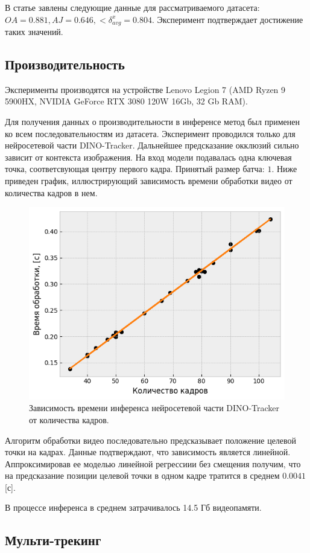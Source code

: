 \documentclass[a4paper, 14pt]{extarticle}
\theoremstyle{definition}
\theoremstyle{plain}
\theoremstyle{remark}
\begin{document}
В статье завлены следующие данные для рассматриваемого датасета:
$OA=0.881, AJ=0.646, <\delta^x_{avg}=0.804$. Эксперимент подтверждает достижение таких значений.
	
\subsection{Производительность}
Эксперименты производятся на устройстве Lenovo Legion 7 (AMD Ryzen 9 5900HX, NVIDIA GeForce RTX 3080 120W 16Gb, 32 Gb RAM).

Для получения данных о производительности в инференсе метод был применен ко всем последовательностям из датасета. Эксперимент проводился только для нейросетевой части DINO-Tracker. Дальнейшее предсказание окклюзий сильно зависит от контекста изображения.
На вход модели подавалась одна ключевая точка, соответсвующая центру первого кадра. Принятый размер батча: $1$.
Ниже приведен график, иллюстрирующий зависимость времени обработки видео от количества кадров в нем. 
\begin{figure}
    [H]
    \centering
    \includegraphics[width=\textwidth]{figs/performance.png}
    \caption{Зависимость времени инференса нейросетевой части DINO-Tracker от количества кадров.}
    \label{fig:performance}
\end{figure}

Алгоритм обработки видео последовательно предсказывает положение целевой точки на кадрах. Данные подтверждают, что зависимость является линейной. Аппроксимировав ее моделью линейной регрессиии без смещения получим, что на предсказание позиции целевой точки в одном кадре тратится в среднем $0.0041$ [с].

В процессе инференса в среднем затрачивалось 14.5 Гб видеопамяти.

\subsection{Мульти-трекинг}


\newpage
\end{document}
